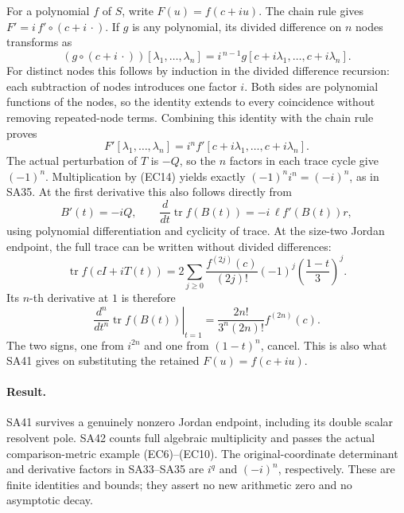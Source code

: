 \documentclass[11pt]{article}
\newcommand{\tr}{\operatorname{tr}}
\begin{document}
For a polynomial \(f\) of \(S\), write \(F(u)=f(c+iu)\).
The chain rule gives \(F'=i\,f'\circ(c+i\,\cdot)\).
If \(g\) is any polynomial, its divided difference on \(n\)
nodes transforms as
\[
 (g\circ(c+i\,\cdot))[\lambda_1,\ldots,\lambda_n]
   =i^{\,n-1}g[c+i\lambda_1,\ldots,c+i\lambda_n].
\]
For distinct nodes this follows by induction in the divided
difference recursion: each subtraction of nodes introduces
one factor \(i\). Both sides are polynomial functions of
the nodes, so the identity extends to every coincidence
without removing repeated-node terms.
Combining this identity with the chain rule proves
\begin{equation}
 F'[\lambda_1,\ldots,\lambda_n]
   =i^n f'[c+i\lambda_1,\ldots,c+i\lambda_n].
 \tag{EC14}
\end{equation}
The actual perturbation of \(T\) is \(-Q\), so the
\(n\) factors in each trace cycle give \((-1)^n\).
Multiplication by (EC14) yields exactly
\((-1)^ni^n=(-i)^n\), as in SA35.
At the first derivative this also follows directly from
\[
 B'(t)=-iQ,\qquad
 \frac{d}{dt}\tr f(B(t))=-i\,\ell f'(B(t))r,
\]
using polynomial differentiation and cyclicity of trace.
At the size-two Jordan endpoint, the full trace can be
written without divided differences:
\[
 \tr f(cI+iT(t))
   =2\sum_{j\ge0}\frac{f^{(2j)}(c)}{(2j)!}
       (-1)^j\left(\frac{1-t}{3}\right)^j .
\]
Its \(n\)-th derivative at \(1\) is therefore
\begin{equation}
 \left.\frac{d^n}{dt^n}\tr f(B(t))\right|_{t=1}
   =\frac{2n!}{3^n(2n)!}f^{(2n)}(c).
 \tag{EC15}
\end{equation}
The two signs, one from \(i^{2n}\) and one from
\((1-t)^n\), cancel. This is also what SA41 gives on
substituting the retained \(F(u)=f(c+iu)\).

\paragraph{Result.}
SA41 survives a genuinely nonzero Jordan endpoint, including its
double scalar resolvent pole. SA42 counts full algebraic multiplicity
and passes the actual comparison-metric example (EC6)--(EC10).
The original-coordinate determinant and derivative factors in
SA33--SA35 are \(i^q\) and \((-i)^n\), respectively.
These are finite identities and bounds; they assert no new arithmetic
zero and no asymptotic decay.
\end{document}
